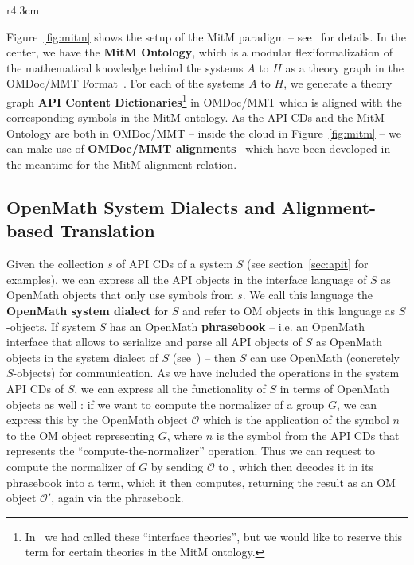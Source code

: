 \begin{wrapfigure}r{4.3cm}\vspace*{-2em}
  \vspace*{-1em}
  \caption{MitM Paradigm}\label{fig:mitm}\vspace*{-1.5em}
\end{wrapfigure}
Figure~\ref{fig:mitm} shows the setup of the MitM paradigm -- see~\cite{DehKohKon:iop16}
for details. In the center, we have the \textbf{MitM Ontology}, which is a modular
flexiformalization of the mathematical knowledge behind the systems $A$ to $H$ as a theory
graph in the OMDoc/MMT Format~\cite{Kohlhase:OMDoc1.2,RabKoh:WSMSML13,uniformal:on}. For
each of the systems $A$ to $H$, we generate a theory graph \textbf{API Content
  Dictionaries}\footnote{In~\cite{DehKohKon:iop16} we had called these ``interface
  theories'', but we would like to reserve this term for certain theories in the MitM
  ontology.}
in OMDoc/MMT which is aligned with the corresponding symbols in the MitM ontology. As the
API CDs and the MitM Ontology are both in OMDoc/MMT -- inside the cloud in
Figure~\ref{fig:mitm} -- we can make use of \textbf{OMDoc/MMT
  alignments}~\cite{MueGauKal:cacfms17} which have been developed in the meantime for the
MitM alignment relation.

\subsection{OpenMath System Dialects and Alignment-based Translation}\label{sec:mitm:dialect}

Given the collection $s$ of API CDs of a system $S$ (see section~\ref{sec:apit} for
examples), we can express all the API objects in the interface language of $S$ as OpenMath
objects that only use symbols from $s$.  We call this language the \textbf{OpenMath system
  dialect} for $S$ and refer to OM objects in this language as $S$-objects.  If system $S$
has an OpenMath \textbf{phrasebook} -- i.e. an OpenMath interface that allows to serialize
and parse all API objects of $S$ as OpenMath objects in the system dialect of $S$
(see~\cite[Section 1.5]{BusCapCar:2oms04}) -- then $S$ can use OpenMath (concretely
$S$-objects) for communication. As we have included the operations in the system API CDs
of $S$, we can express all the functionality of $S$ in terms of OpenMath objects as well :
if we want \GAP to compute the normalizer of a group $G$, we can express this by the
OpenMath object $\mathcal{O}$ which is the application of the symbol $n$ to the OM object
representing $G$, where $n$ is the symbol from the \GAP API CDs that represents the
``compute-the-normalizer'' operation.  Thus we can request \GAP to compute the normalizer
of $G$ by sending $\mathcal{O}$ to \GAP, which then decodes it in its phrasebook into a \GAP
term, which it then computes, returning the result as an OM object $\mathcal{O}'$, again
via the \GAP phrasebook.

